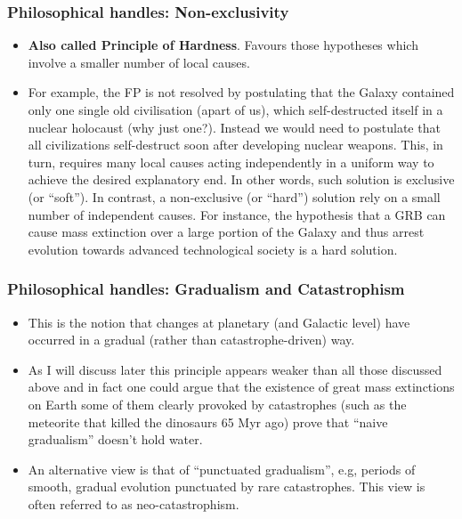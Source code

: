 \begin{frame}
\frametitle{Philosophical handles: Non-exclusivity}
\begin{itemize}
\item {\bf Also called Principle of Hardness}.  Favours those hypotheses which involve a smaller number of local causes. 
\item For example, the FP  is not resolved by postulating that the Galaxy contained only one  single old civilisation (apart of us), which self-destructed itself in a nuclear holocaust (why just one?). Instead we would need to postulate that all civilizations self-destruct soon after developing nuclear weapons. This, in turn, requires many local causes acting independently in a uniform way to achieve the desired explanatory end. In other words, such solution is exclusive (or ``soft''). In contrast, a non-exclusive (or ``hard'') solution rely on a small number of independent causes. For instance, the hypothesis that a GRB can cause mass extinction over a large portion of the Galaxy and thus arrest evolution towards advanced technological society is a hard solution. 
\end{itemize}

\end{frame}

\begin{frame}
\frametitle{Philosophical handles: Gradualism and Catastrophism}
\begin{itemize}
\item This is the notion that changes at planetary (and Galactic level) have occurred in a gradual (rather than catastrophe-driven) way. 
\item As I will discuss later this principle appears weaker than all those discussed above and in fact one could argue that the existence of great mass extinctions on Earth some of them clearly provoked by catastrophes (such as the meteorite that killed the dinosaurs 65 Myr ago) prove that ``naive gradualism'' doesn't hold water. 
\item An alternative view is that of ``punctuated gradualism'', e.g, periods of smooth, gradual evolution punctuated by rare catastrophes. This view is often referred to as neo-catastrophism. 
\end{itemize}

\end{frame}

\begin{frame}
\frametitle{Classification of FP solutions}

\begin{itemize}
\item Proposed by Cirkovic in 2009\footnote{Serb. Astron. J. } 178 (2009), 1 - 20}.
\end{{itemize}
\texttt{[image: FPclassification.pdf]}

\end{frame}

